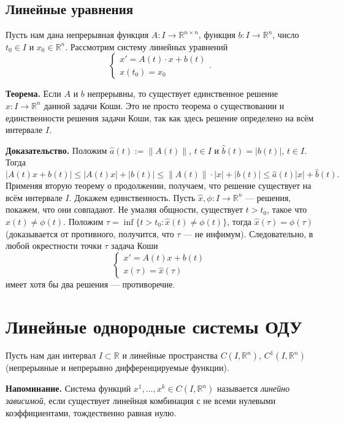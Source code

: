 \subsection{Линейные уравнения}
Пусть нам дана непрерывная функция $A: I \to \mathbb R^{n \times n}$, функция $b: I \to \mathbb R^n$, число $t_0 \in I$ и $x_0 \in \mathbb R^n$. 
Рассмотрим систему линейных уравнений
\[
    \begin{cases}
        x' = A(t) \cdot x + b(t) \\
        x(t_0) = x_0
    \end{cases} .
\]

\textbf{Теорема.} Если $A$ и $b$ непрерывны, то существует единственное решение $x: I \to \mathbb R^n$ данной задачи Коши.
Это не просто теорема о существовании и единственности решения задачи Коши, так как здесь решение определено на всём интервале $I$.

\textbf{Доказательство.} Положим $\widehat a(t) := \| A(t) \|$, $t \in I$ и $\widehat b(t) = |b(t)|$, $t \in I$.
Тогда
\[
    |A(t)x + b(t)| \le |A(t)x| + |b(t)| \le \|A(t) \| \cdot |x| + |b(t)| \le \widehat a(t)|x| + \widehat b(t).
\]
Применяя вторую теорему о продолжении, получаем, что решение существует на всём интервале $I$.
Докажем единственность. Пусть $\widehat x, \phi: I \to \mathbb R^n$ --- решения, покажем, что они совпадают.
Не умаляя общности, существует $t > t_0$, такое что $\widehat x(t) \ne \phi(t)$.
Положим $\tau = \inf \{t > t_0: \widehat x(t) \ne \phi(t)\}$, тогда $\widehat x(\tau) = \phi(\tau)$ (доказывается от противного, получится, что $\tau$ --- не инфимум).
Следовательно, в любой окрестности точки $\tau$ задача Коши
\[
    \begin{cases}
        x' = A(t)x + b(t) \\
        x(\tau) = \widehat x(\tau)
    \end{cases}
\]
имеет хотя бы два решения --- противоречие.

\QED

\section{Линейные однородные системы ОДУ}
Пусть нам дан интервал $I \subset \mathbb R$ и линейные пространства $C(I, \mathbb R^n)$, $C^1(I, \mathbb R^n)$ (непрерывные и непрерывно дифференцируемые функции).

\textbf{Напоминание.} Система функций $x^1, \dots, x^k \in C(I, \mathbb R^n)$ называется \textit{линейно зависимой}, если существует линейная комбинация с не всеми нулевыми коэффициентами, тождественно равная нулю.

